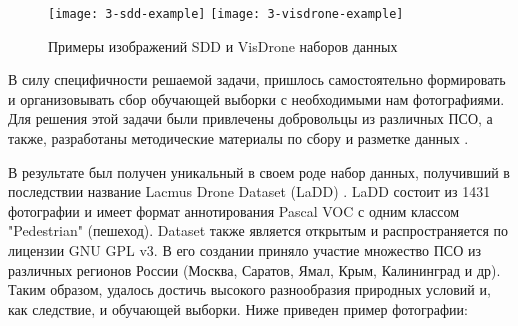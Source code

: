 \begin{figure}[H]
    \centering
    \texttt{[image: 3-sdd-example]}
    \hfill
    \texttt{[image: 3-visdrone-example]}
    \caption{Примеры изображений SDD и VisDrone наборов данных} \label{sdd-visdrone-example}
\end{figure}


В силу специфичности решаемой задачи, пришлось самостоятельно формировать и организовывать сбор обучающей выборки с необходимыми нам фотографиями. Для решения этой задачи были привлечены добровольцы из различных ПСО, а также, разработаны методические материалы по сбору и разметке данных \cite{lib-lacmus-wiki-images}\cite{lib-lacmus-wiki-label}.

В результате был получен уникальный в своем роде набор данных, получивший в последствии название Lacmus Drone Dataset (LaDD) \cite{lib-ladd}. LaDD состоит из 1431 фотографии и имеет формат аннотирования Pascal VOC \cite{lib-pascal} с одним классом "Pedestrian" (пешеход). Dataset также является открытым и распространяется по лицензии GNU GPL v3. В его создании приняло участие множество ПСО из различных регионов России (Москва, Саратов, Ямал, Крым, Калининград и др). Таким образом, удалось достичь высокого разнообразия природных условий и, как следствие, и обучающей выборки. Ниже приведен пример фотографии:


\clearpage